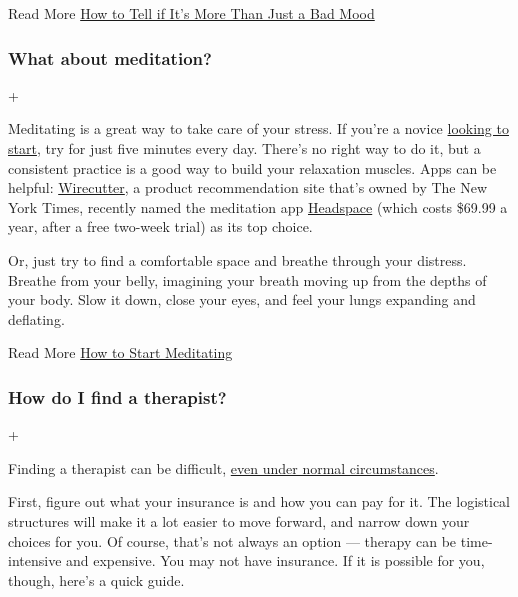  Read More
\href{https://www.nytimes3xbfgragh.onion/2020/05/21/well/coronavirus-depression.html}{How
to Tell if It's More Than Just a Bad Mood}

\hypertarget{what-about-meditation}{%
\subsubsection{What about meditation?}\label{what-about-meditation}}

+

Meditating is a great way to take care of your stress. If you're a
novice
\href{https://www.nytimes3xbfgragh.onion/2020/06/22/at-home/how-to-start-meditating.html}{looking
to start}, try for just five minutes every day. There's no right way to
do it, but a consistent practice is a good way to build your relaxation
muscles. Apps can be helpful:
\href{https://www.nytimes3xbfgragh.onion/wirecutter/}{Wirecutter}, a
product recommendation site that's owned by The New York Times, recently
named the meditation app \href{https://www.headspace.com/}{Headspace}
(which costs \$69.99 a year, after a free two-week trial) as its top
choice.

Or, just try to find a comfortable space and breathe through your
distress. Breathe from your belly, imagining your breath moving up from
the depths of your body. Slow it down, close your eyes, and feel your
lungs expanding and deflating.

 Read More
\href{https://www.nytimes3xbfgragh.onion/2020/06/22/at-home/how-to-start-meditating.html}{How
to Start Meditating}

\hypertarget{how-do-i-find-a-therapist}{%
\subsubsection{How do I find a
therapist?}\label{how-do-i-find-a-therapist}}

+

Finding a therapist can be difficult,
\href{https://www.nytimes3xbfgragh.onion/2017/07/17/smarter-living/how-to-find-the-right-therapist.html}{even
under normal circumstances}.

First, figure out what your insurance is and how you can pay for it. The
logistical structures will make it a lot easier to move forward, and
narrow down your choices for you. Of course, that's not always an option
--- therapy can be time-intensive and expensive. You may not have
insurance. If it is possible for you, though, here's a quick guide.

